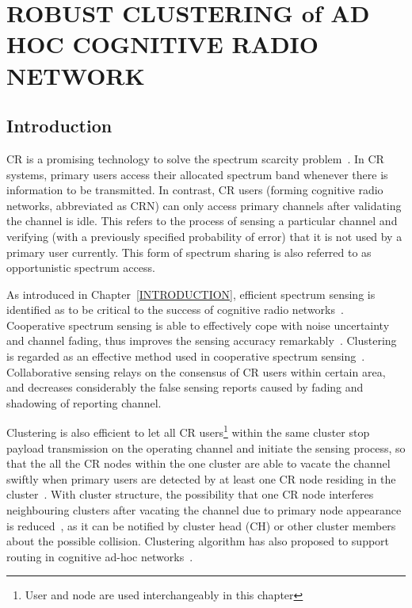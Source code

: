 \chapter{ROBUST CLUSTERING of AD HOC COGNITIVE RADIO NETWORK}
\section{Introduction}
\label{intro}
\gls{CR} is a promising technology to solve the spectrum scarcity problem~\cite{Mitola}. 
In CR systems, primary users access their allocated spectrum band whenever there is information to be transmitted. 
In contrast, CR users (forming cognitive radio networks, abbreviated as CRN) can only access primary channels after validating the channel is idle. 
This refers to the process of sensing a particular channel and verifying (with a previously specified probability of error) that it is not used by a primary user currently. 
This form of spectrum sharing is also referred to as opportunistic spectrum access.






As introduced in Chapter~\ref{INTRODUCTION}, efficient spectrum sensing is identified as to be critical to the success of cognitive radio networks~\cite{Sahai_FundamentalDesignTradeoffs2006}.
Cooperative spectrum sensing is able to effectively cope with noise uncertainty and channel
fading, thus improves the sensing accuracy remarkably~\cite{coorperativeSensing_Akyildiz11}.
Clustering is regarded as an effective method used in cooperative spectrum sensing~\cite{Sun07_clustering_spectrum_secsing, Zhao07}.
Collaborative sensing relays on the consensus of CR users within certain area, and decreases considerably the false sensing reports caused by fading and shadowing of reporting channel.

Clustering is also efficient to let all CR users\footnote{User and node are used interchangeably in this chapter} within the same cluster stop payload transmission on the operating channel and initiate the sensing process, so that the all the CR nodes within the one cluster are able to vacate the channel swiftly when primary users are detected by at least one CR node residing in the cluster~\cite{willkomm08}.
With cluster structure, the possibility that one CR node interferes neighbouring clusters after vacating the channel due to primary node appearance is reduced~\cite{centralizedSharing80222}, as it can be notified by cluster head (\gls{CH}) or other cluster members about the possible collision. 
Clustering algorithm has also proposed to support routing in cognitive ad-hoc networks~\cite{Abbasi_survey_07}.

